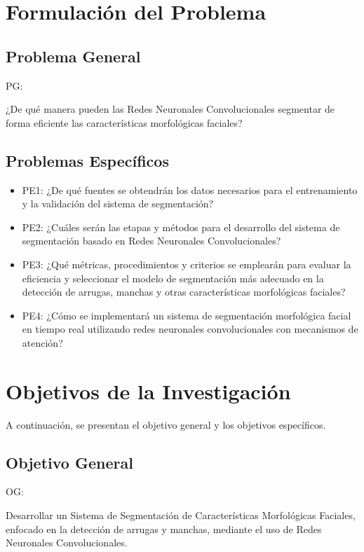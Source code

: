 \section{Formulación del Problema}

\subsection{Problema General}
PG: \newcommand{\ProblemaGeneral}{
¿De qué manera pueden las Redes Neuronales Convolucionales segmentar de forma eficiente las características morfológicas faciales?
}
\ProblemaGeneral

\subsection{Problemas Específicos}
\newcommand{\Pbone}{
¿De qué fuentes se obtendrán los datos necesarios para el entrenamiento y la validación del sistema de segmentación?
}
\newcommand{\Pbtwo}{
¿Cuáles serán las etapas y métodos para el desarrollo del sistema de segmentación basado en Redes Neuronales Convolucionales?
}
\newcommand{\Pbthree}{
¿Qué métricas, procedimientos y criterios se emplearán para evaluar la eficiencia y seleccionar el modelo de segmentación más adecuado en la detección de arrugas, manchas y otras características morfológicas faciales?
}
\newcommand{\Pbfour}{
¿Cómo se implementará un sistema de segmentación morfológica facial en tiempo real utilizando redes neuronales convolucionales con mecanismos de atención?
}

\begin{itemize}
	\item PE1: {\Pbone}
	\item PE2: {\Pbtwo}
	\item PE3: {\Pbthree}
	\item PE4: {\Pbfour}
\end{itemize}

\section{Objetivos de la Investigación}
A continuación, se presentan el objetivo general y los objetivos específicos.
\subsection{Objetivo General}
OG: \newcommand{\ObjetivoGeneral}{
Desarrollar un Sistema de Segmentación de Características Morfológicas Faciales, enfocado en la detección de arrugas y manchas, mediante el uso de Redes Neuronales Convolucionales.
}
\ObjetivoGeneral
